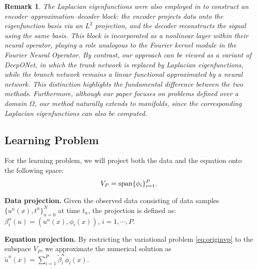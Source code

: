 \documentclass[preprint,12pt]{elsarticle}
\theoremstyle{plain}
\newtheorem{remark}{Remark}[section]
\numberwithin{figure}{section}
\numberwithin{table}{section}
\newcommand{\jddd}[1]{{\color{black}#1}}
\begin{document}
\jddd{
\begin{remark}
The Laplacian eigenfunctions were also employed in \cite{chen2024learning} to construct an encoder–approximation–decoder block: the encoder projects data onto the eigenfunction basis via an $L^2$ projection, and the decoder reconstructs the signal using the same basis. This block is incorporated as a nonlinear layer within their neural operator, playing a role analogous to the Fourier kernel module in the Fourier Neural Operator. By contrast, our approach can be viewed as a variant of DeepONet, in which the trunk network is replaced by Laplacian eigenfunctions, while the branch network remains a linear functional approximated by a neural network. This distinction highlights the fundamental difference between the two methods. Furthermore, although our paper focuses on problems defined over a domain $\Omega$, our method naturally extends to manifolds, since the corresponding Laplacian eigenfunctions can also be computed.   
\end{remark}

}
\subsection{Learning Problem}
For the learning problem, we will project both the data and the equation onto the following space:
\begin{equation}
	V_P = {\rm span}\{\phi_i\}_{i=1}^P.
\end{equation}

{\bf Data projection.}  Given the observed data consisting of data samples $\{u^n(x), t^n\}_{n=0}^N$ at time $t_n$, the projection is defined as: $\beta_i^n(u)=(u^n(x),\phi_i(x))$, $i=1,\cdots,P$.

{\bf Equation projection.} By restricting the variational problem \eqref{eq:originvp} to the subspace $V_P$, we approximate the numerical solution as 
$\displaystyle \widetilde{u}^n(x)=\sum_{i=1}^{P}\widetilde{\beta}_i^n\phi_i(x).$
\end{document}
